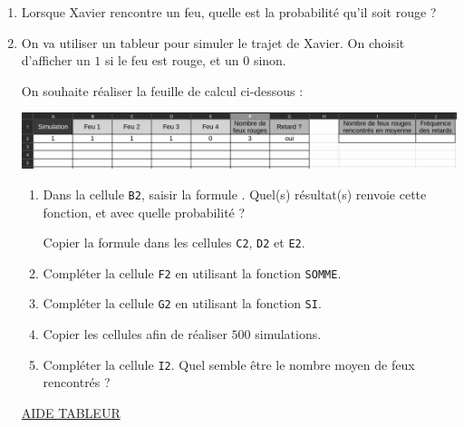 \documentclass[
	classe=$1^{ere}STI2D$,
	grayscale
]{informatique}
\begin{document}
\begin{enumerate}
	\item Lorsque Xavier rencontre un feu, quelle est la probabilité qu'il soit rouge ?
	\item On va utiliser un tableur pour simuler le trajet de Xavier. On choisit d'afficher un $1$ si le feu est rouge, et un $0$ sinon.

	      On souhaite réaliser la feuille de calcul ci-dessous :

	      \begin{center}
		      \includegraphics[width=0.9\linewidth]{Images/Tableur feux rouges (gris).png}
	      \end{center}

	      \begin{minipage}{0.5\textwidth}
		      \begin{enumerate}
			      \item Dans la cellule \texttt{B2}, saisir la formule . Quel(s) résultat(s) renvoie cette fonction, et avec quelle probabilité ?


			            Copier la formule dans les cellules \texttt{C2}, \texttt{D2} et \texttt{E2}.
			      \item Compléter la cellule \texttt{F2} en utilisant la fonction \texttt{SOMME}.
			      \item Compléter la cellule \texttt{G2} en utilisant la fonction \texttt{SI}.
			      \item Copier les cellules afin de réaliser $500$ simulations.
			      \item Compléter la cellule \texttt{I2}. Quel semble être le nombre moyen de feux rencontrés ? 
		      \end{enumerate}
	      \end{minipage}\hspace{0.02\textwidth}
	      \begin{minipage}{0.45\textwidth}
		      \begin{tcolorbox}
			      {\large\uline{AIDE TABLEUR}}



\end{tcolorbox}
\end{minipage}
\end{enumerate}
\end{document}
